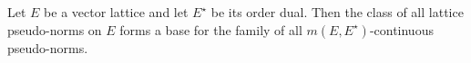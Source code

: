 Let $E$ be a vector lattice and let $E^\star$ be its order dual. Then the class of all lattice pseudo-norms on $E$ forms a base for the family of all $m(E, E^\star)$-continuous pseudo-norms.
